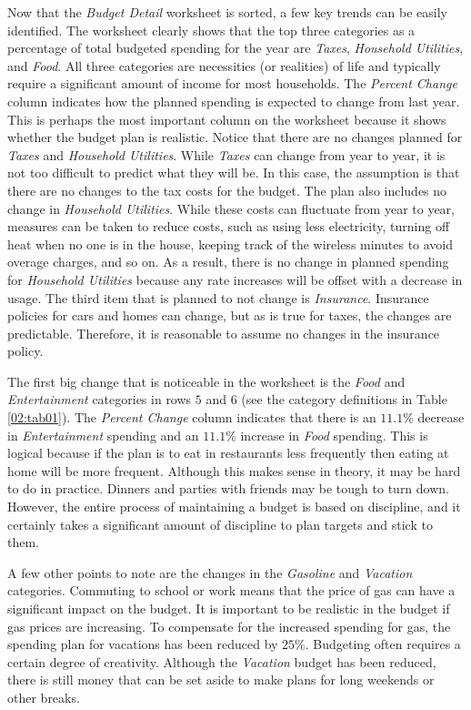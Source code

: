 Now that the \textit{Budget Detail} worksheet is sorted, a few key trends can be easily identified. The worksheet clearly shows that the top three categories as a percentage of total budgeted spending for the year are \textit{Taxes}, \textit{Household Utilities}, and \textit{Food}. All three categories are necessities (or realities) of life and typically require a significant amount of income for most households. The \textit{Percent Change} column indicates how the planned spending is expected to change from last year. This is perhaps the most important column on the worksheet because it shows whether the budget plan is realistic. Notice that there are no changes planned for \textit{Taxes} and \textit{Household Utilities}. While \textit{Taxes} can change from year to year, it is not too difficult to predict what they will be. In this case, the assumption is that there are no changes to the tax costs for the budget. The plan also includes no change in \textit{Household Utilities}. While these costs can fluctuate from year to year, measures can be taken to reduce costs, such as using less electricity, turning off heat when no one is in the house, keeping track of the wireless minutes to avoid overage charges, and so on. As a result, there is no change in planned spending for \textit{Household Utilities} because any rate increases will be offset with a decrease in usage. The third item that is planned to not change is \textit{Insurance}. Insurance policies for cars and homes can change, but as is true for taxes, the changes are predictable. Therefore, it is reasonable to assume no changes in the insurance policy.

The first big change that is noticeable in the worksheet is the \textit{Food} and \textit{Entertainment} categories in rows $ 5 $ and $ 6 $ (see the category definitions in Table \ref{02:tab01}). The \textit{Percent Change} column indicates that there is an $ 11.1\% $ decrease in \textit{Entertainment} spending and an $ 11.1\% $ increase in \textit{Food} spending. This is logical because if the plan is to eat in restaurants less frequently then eating at home will be more frequent. Although this makes sense in theory, it may be hard to do in practice. Dinners and parties with friends may be tough to turn down. However, the entire process of maintaining a budget is based on discipline, and it certainly takes a significant amount of discipline to plan targets and stick to them.

A few other points to note are the changes in the \textit{Gasoline} and \textit{Vacation} categories. Commuting to school or work means that the price of gas can have a significant impact on the budget. It is important to be realistic in the budget if gas prices are increasing. To compensate for the increased spending for gas, the spending plan for vacations has been reduced by $ 25\% $. Budgeting often requires a certain degree of creativity. Although the \textit{Vacation} budget has been reduced, there is still money that can be set aside to make plans for long weekends or other breaks.

